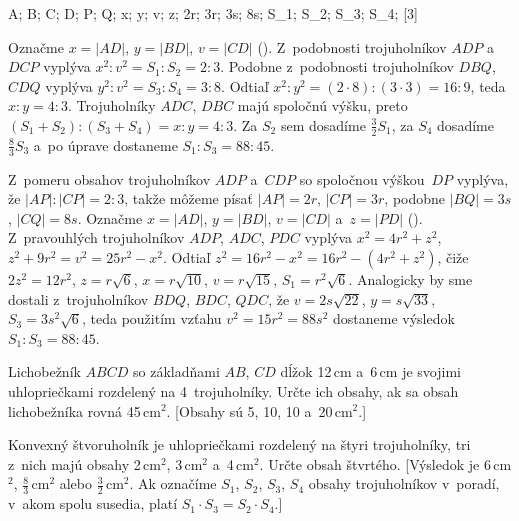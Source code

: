 {%
\fontplace
\tpoint A; \tpoint B; \bpoint C;
\tpoint D; \rBpoint P; \blpoint Q;
\tpoint x; \tpoint y; \rpoint v; \bpoint z;
\rBpoint 2r; \rBpoint 3r; \lBpoint 3s; \lBpoint 8s;
\cpoint S_1; \cpoint S_2; \cpoint S_3; \cpoint S_4;
[3] \hfil\Obr

Označme $x=|AD|$, $y=|BD|$, $v=|CD|$ (\obr). Z~podobnosti
trojuholníkov $ADP$ a~$DCP$ vyplýva $x^2:v^2=S_1:S_2=2:3$.
Podobne z~podobnosti trojuholníkov $DBQ$, $CDQ$ vyplýva
$y^2:v^2=S_3:S_4=3:8$. Odtiaľ $x^2:y^2=(2\cdot8):(3\cdot3)=16:9$, teda
$x:y=4:3$. Trojuholníky $ADC$, $DBC$ majú spoločnú výšku,
preto $(S_1+S_2):(S_3+S_4)=x:y=4:3$. Za
$S_2$ sem dosadíme $\frac32S_1$, za $S_4$ dosadíme $\frac83S_3$
a~po úprave dostaneme $S_1:S_3=88:45$.
\inspicture{}

\ineriesenie
Z~pomeru obsahov trojuholníkov $ADP$ a~$CDP$ so spoločnou výškou~$DP$
vyplýva, že $|AP|:|CP|=2:3$, takže môžeme
písať $|AP|=2r$, $|CP|=3r$, podobne $|BQ|=3s$, $|CQ|=8s$.
Označme $x=|AD|$, $y=|BD|$, $v=|CD|$ a~$z=|PD|$
(). Z~pravouhlých trojuholníkov $ADP$, $ADC$, $PDC$ vyplýva
$x^2=4r^2+z^2$, $z^2+9r^2=v^2=25r^2-x^2$. Odtiaľ
$z^2=16r^2-x^2=16r^2-(4r^2+z^2)$, čiže $2z^2=12r^2$,
$z=r\sqrt6$, $x=r\sqrt{10}$, $v=r\sqrt{15}$, $S_1 = r^2\sqrt6$. 
Analogicky by sme dostali 
z~trojuholníkov $BDQ$, $BDC$, $QDC$, že $v=2s\sqrt{22}$, $y=s\sqrt{33}$,
$S_3 = 3s^2\sqrt6$, teda použitím vzťahu $v^2=15r^2=88s^2$
dostaneme výsledok $S_1 : S_3 =88:45$.


Lichobežník $ABCD$ so základňami $AB$, $CD$ dĺžok 12\,cm a~6\,cm
je svojimi uhlopriečkami rozdelený na 4~trojuholníky. Určte ich
obsahy, ak sa obsah lichobežníka rovná 45\,cm$^{2}$.
[Obsahy sú 5, 10, 10 a~20\,cm$^{2}$.]

Konvexný štvoruholník je uhlopriečkami rozdelený na štyri
trojuholníky, tri z~nich majú obsahy 2\,cm$^{2}$, 3\,cm$^{2}$ 
a~4\,cm$^{2}$. Určte obsah štvrtého. [Výsledok je 6\,cm$^{2}$,
$\frac83$\,cm$^{2}$ alebo $\frac32$\,cm$^{2}$. Ak označíme $S_1$, 
$S_2$, $S_3$, $S_4$ obsahy trojuholníkov v~poradí, v~akom spolu susedia,
platí $S_1\cdot S_3=S_2\cdot S_4$.]
}

